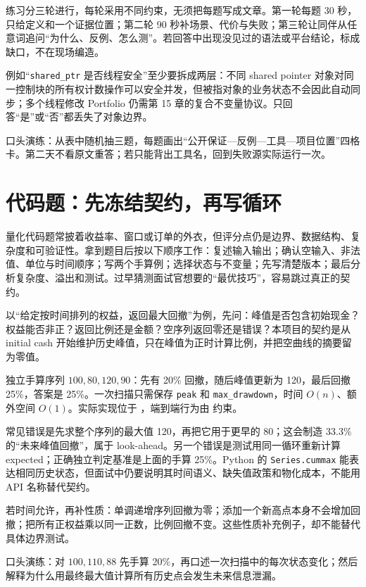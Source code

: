 练习分三轮进行，每轮采用不同约束，无须把每题写成文章。第一轮每题 30 秒，只给定义和一个证据位置；第二轮 90 秒补场景、代价与失败；第三轮让同伴从任意词追问“为什么、反例、怎么测”。若回答中出现没见过的语法或平台结论，标成缺口，不在现场编造。

例如“\texttt{shared\_ptr} 是否线程安全”至少要拆成两层：不同 shared pointer 对象对同一控制块的所有权计数操作可以安全并发，但被指对象的业务状态不会因此自动同步；多个线程修改 Portfolio 仍需第 15 章的复合不变量协议。只回答“是”或“否”都丢失了对象边界。

口头演练：从表中随机抽三题，每题画出“公开保证—反例—工具—项目位置”四格卡。第二天不看原文重答；若只能背出工具名，回到失败源实际运行一次。

\section{代码题：先冻结契约，再写循环}

量化代码题常披着收益率、窗口或订单的外衣，但评分点仍是边界、数据结构、复杂度和可验证性。拿到题目后按以下顺序工作：复述输入输出；确认空输入、非法值、单位与时间顺序；写两个手算例；选择状态与不变量；先写清楚版本；最后分析复杂度、溢出和测试。过早猜测面试官想要的“最优技巧”，容易跳过真正的契约。

以“给定按时间排列的权益，返回最大回撤”为例，先问：峰值是否包含初始现金？权益能否非正？返回比例还是金额？空序列返回零还是错误？本项目的契约是从 initial cash 开始维护历史峰值，只在峰值为正时计算比例，并把空曲线的摘要留为零值。

独立手算序列 \(100,80,120,90\)：先有 20\% 回撤，随后峰值更新为 120，最后回撤 25\%，答案是 25\%。一次扫描只需保存 \texttt{peak} 和 \texttt{max\_drawdown}，时间 \(O(n)\)、额外空间 \(O(1)\)。实际实现位于 ，端到端行为由  约束。

常见错误是先求整个序列的最大值 120，再把它用于更早的 80；这会制造 33.3\% 的“未来峰值回撤”，属于 look-ahead。另一个错误是测试用同一循环重新计算 expected；正确独立判定基准是上面的手算 25\%。Python 的 \texttt{Series.cummax} 能表达相同历史状态，但面试中仍要说明其时间语义、缺失值政策和物化成本，不能用 API 名称替代契约。

若时间允许，再补性质：单调递增序列回撤为零；添加一个新高点本身不会增加回撤；把所有正权益乘以同一正数，比例回撤不变。这些性质补充例子，却不能替代具体边界测试。

口头演练：对 \(100,110,88\) 先手算 20\%，再口述一次扫描中的每次状态变化；然后解释为什么用最终最大值计算所有历史点会发生未来信息泄漏。

